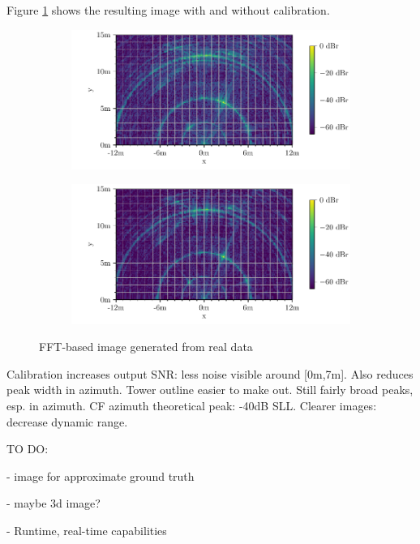 Figure \ref{fig:fft_testimg} shows the resulting image with and without calibration.
\begin{figure}
    \centering
    \begin{subfigure}{0.8\textwidth}
        \includegraphics[width=\textwidth]{../figures/testimg_uncalibrated_fft.pdf}
    \end{subfigure}
    \begin{subfigure}{0.8\textwidth}
        \includegraphics[width=\textwidth]{../figures/testimg_calibrated_fft.pdf}
    \end{subfigure}
    \caption{FFT-based image generated from real data}
    \label{fig:fft_testimg}
\end{figure}
Calibration increases output SNR: less noise visible around [0m,7m]. Also reduces peak width in azimuth. Tower outline easier to make out.
Still fairly broad peaks, esp. in azimuth. CF azimuth theoretical peak: -40dB SLL. Clearer images: decrease dynamic range.

TO DO:

- image for approximate ground truth

- maybe 3d image?

- Runtime, real-time capabilities


